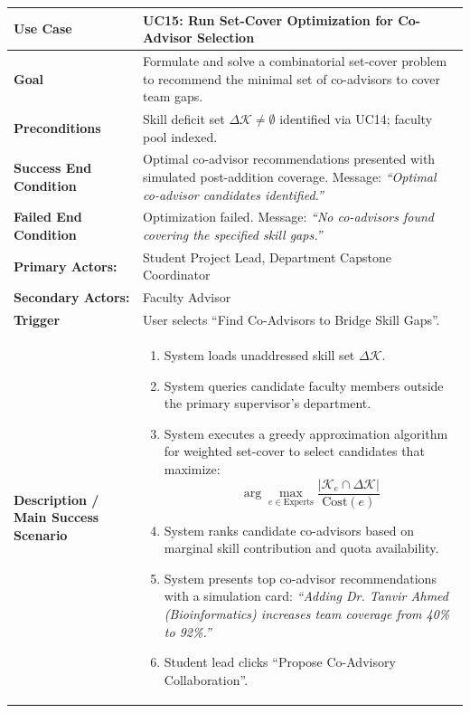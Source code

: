 \begin{table}[H]
\centering
\small
\begin{tabularx}{\textwidth}{|l|X|}
\hline
\rowcolor{lightgray!40} \textbf{Use Case} & \textbf{UC15: Run Set-Cover Optimization for Co-Advisor Selection} \\ \hline
\textbf{Goal} & Formulate and solve a combinatorial set-cover problem to recommend the minimal set of co-advisors to cover team gaps. \\ \hline
\textbf{Preconditions} & Skill deficit set $\Delta \mathcal{K} \ne \emptyset$ identified via UC14; faculty pool indexed. \\ \hline
\textbf{Success End Condition} & Optimal co-advisor recommendations presented with simulated post-addition coverage. Message: \textit{``Optimal co-advisor candidates identified.''} \\ \hline
\textbf{Failed End Condition} & Optimization failed. Message: \textit{``No co-advisors found covering the specified skill gaps.''} \\ \hline
\textbf{Primary Actors:} & Student Project Lead, Department Capstone Coordinator \\
\textbf{Secondary Actors:} & Faculty Advisor \\ \hline
\textbf{Trigger} & User selects ``Find Co-Advisors to Bridge Skill Gaps''. \\ \hline
\textbf{Description / Main Success Scenario} &
\begin{enumerate}[leftmargin=*]
    \item System loads unaddressed skill set $\Delta \mathcal{K}$.
    \item System queries candidate faculty members outside the primary supervisor's department.
    \item System executes a greedy approximation algorithm for weighted set-cover to select candidates that maximize:
    $$\arg\max_{e \in \text{Experts}} \frac{|\mathcal{K}_e \cap \Delta \mathcal{K}|}{\text{Cost}(e)}$$
    \item System ranks candidate co-advisors based on marginal skill contribution and quota availability.
    \item System presents top co-advisor recommendations with a simulation card: \textit{``Adding Dr. Tanvir Ahmed (Bioinformatics) increases team coverage from 40\% to 92\%.''}
    \item Student lead clicks ``Propose Co-Advisory Collaboration''.
\end{enumerate} \\ \hline

\end{tabularx}
\end{table}
